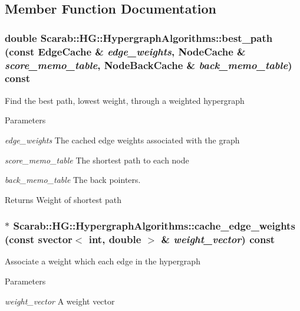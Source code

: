 \subsection{Member Function Documentation}
\hypertarget{class_scarab_1_1_h_g_1_1_hypergraph_algorithms_aa9a28bf42d17a166ec5e780067e33259}{
\subsubsection[{best\_\-path}]{\setlength{\rightskip}{0pt plus 5cm}double Scarab::HG::HypergraphAlgorithms::best\_\-path (const {\bf EdgeCache} \& {\em edge\_\-weights}, \/  {\bf NodeCache} \& {\em score\_\-memo\_\-table}, \/  {\bf NodeBackCache} \& {\em back\_\-memo\_\-table}) const}}
\label{class_scarab_1_1_h_g_1_1_hypergraph_algorithms_aa9a28bf42d17a166ec5e780067e33259}
Find the best path, lowest weight, through a weighted hypergraph 
\begin{DoxyParams}{Parameters}
\item[{\em edge\_\-weights}]The cached edge weights associated with the graph \item[{\em score\_\-memo\_\-table}]The shortest path to each node \item[{\em back\_\-memo\_\-table}]The back pointers. \end{DoxyParams}
\begin{DoxyReturn}{Returns}
Weight of shortest path 
\end{DoxyReturn}
\hypertarget{class_scarab_1_1_h_g_1_1_hypergraph_algorithms_a28f83d7616f6153ca7c909fe82c5b0fa}{
\subsubsection[{cache\_\-edge\_\-weights}]{ $\ast$ Scarab::HG::HypergraphAlgorithms::cache\_\-edge\_\-weights (const svector$<$ int, double $>$ \& {\em weight\_\-vector}) const}}
\label{class_scarab_1_1_h_g_1_1_hypergraph_algorithms_a28f83d7616f6153ca7c909fe82c5b0fa}
Associate a weight which each edge in the hypergraph 
\begin{DoxyParams}{Parameters}
\item[{\em weight\_\-vector}]A weight vector \end{DoxyParams}
